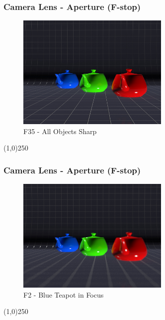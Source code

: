 \begin{frame}
\frametitle{Camera Lens - Aperture (F-stop)}
\begin{figure}
	\centering
	\includegraphics[height=5.5cm]{img/Cameras/F35Teapots.jpg}
	\caption[F35 - All Objects Sharp]{F35 - All Objects Sharp}
	\label{fig:F35}
\end{figure}
\end{frame}
\begin{center}\line(1,0){250}\end{center}



\begin{frame}
\frametitle{Camera Lens - Aperture (F-stop)}
\begin{figure}
	\centering
	\includegraphics[height=5.5cm]{img/Cameras/BlueTeapot.jpg}
	\caption[F2 - Blue Teapot in Focus]{F2 - Blue Teapot in Focus}
	\label{fig:F2-BlueTeaPot}
\end{figure}
\end{frame}
\begin{center}\line(1,0){250}\end{center}



